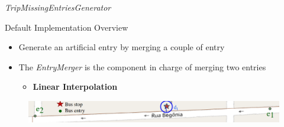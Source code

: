 \documentclass[xcolor=dvipsnames,table]{beamer}
\begin{document}
\begin{frame}{\textit{TripMissingEntriesGenerator}}
        \begin{block}{Default Implementation Overview}
                \begin{itemize}
                        \item Generate an artificial entry by merging a couple of entry
                        \item The \textit{EntryMerger} is the component
                                in charge of merging two entries
                                \begin{itemize}
                                        \item \textbf{Linear Interpolation}
                                \end{itemize}
                \end{itemize}
        \end{block}
        \begin{figure}[h]
                \centering
                \includegraphics[width=\textwidth]{images/9202_empty_set.png}
        \end{figure}
\end{frame}
\end{document}
